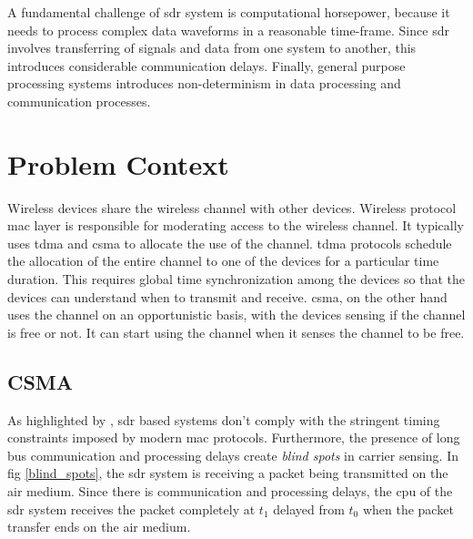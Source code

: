 
A fundamental challenge of \ac{sdr} system is computational horsepower, because it needs to process complex data waveforms in a reasonable time-frame. Since \ac{sdr} involves transferring of signals and data from one system to another, this introduces considerable communication delays. Finally, general purpose processing systems introduces non-determinism in data processing and communication processes.\\


\section{Problem Context}
Wireless devices share the wireless channel with other devices. Wireless protocol \ac{mac} layer is responsible for moderating access to the wireless channel. It typically uses \ac{tdma} and \ac{csma} to allocate the use of the channel. \ac{tdma} protocols schedule the allocation of the entire channel to one of the devices for a particular time duration. This requires global time synchronization among the devices so that the devices can understand when to transmit and receive. \ac{csma}, on the other hand uses the channel on an opportunistic basis, with the devices sensing if the channel is free or not. It can start using the channel when it senses the channel to be free.\\

\subsection{CSMA}
As highlighted by \cite{schmid_experimental_2007}, \ac{sdr} based systems don't comply with the stringent timing constraints imposed by modern \ac{mac} protocols. Furthermore, the presence of long bus communication and processing delays create \textit{blind spots}\cite{schmid_experimental_2007} in carrier sensing. In fig \ref{blind_spots}, the \ac{sdr} system is receiving a packet being transmitted on the air medium. Since there is communication and processing delays, the \ac{cpu} of the \ac{sdr} system  receives the packet completely at $t_1$ delayed from $t_0$ when the packet transfer ends on the air medium.\\

